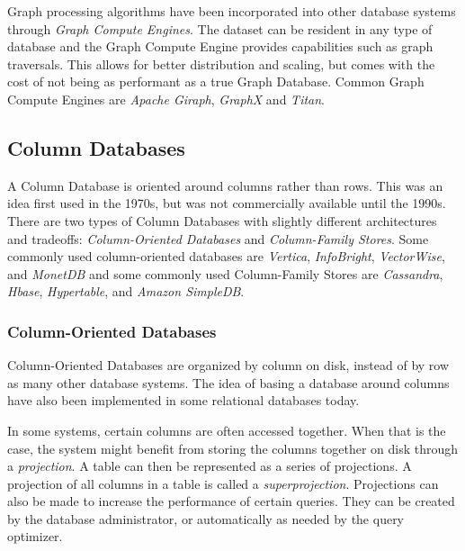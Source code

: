 Graph processing algorithms have been incorporated into other database systems through \emph{Graph Compute Engines}. The dataset can be resident in any type of database and the Graph Compute Engine provides capabilities such as graph traversals. This allows for better distribution and scaling, but comes with the cost of not being as performant as a true Graph Database. Common Graph Compute Engines are \emph{Apache Giraph}, \emph{GraphX} and \emph{Titan}.

\subsection{Column Databases}
\label{intro-col-db}

A Column Database is oriented around columns rather than rows. This was an idea first used in the 1970s, but was not commercially available until the 1990s.
There are two types of Column Databases with slightly different architectures and tradeoffs: \emph{Column-Oriented Databases} and \emph{Column-Family Stores}.
Some commonly used column-oriented databases are \emph{Vertica}, \emph{InfoBright}, \emph{VectorWise}, and \emph{MonetDB} and some commonly used Column-Family Stores are \emph{Cassandra}, \emph{Hbase}, \emph{Hypertable}, and \emph{Amazon SimpleDB}.

\subsubsection{Column-Oriented Databases}

Column-Oriented Databases are organized by column on disk, instead of by row as many other database systems.
The idea of basing a database around columns have also been implemented in some relational databases today.

In some systems, certain columns are often accessed together. When that is the case, the system might benefit from storing the columns together on disk through a \emph{projection}. A table can then be represented as a series of projections. A projection of all columns in a table is called a \emph{superprojection}. Projections can also be made to increase the performance of certain queries. They can be created by the database administrator, or automatically as needed by the query optimizer.

